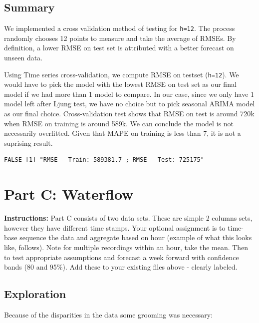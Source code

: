 \documentclass[openany]{book}
\renewenvironment{quote}{\begin{myquote}}{\end{myquote}}
\begin{document}
\hypertarget{summary-1}{%
\section{Summary}\label{summary-1}}

We implemented a cross validation method of testing for \texttt{h=12}.
The process randomly chooses 12 points to measure and take the average
of RMSEs. By definition, a lower RMSE on test set is attributed with a
better forecast on unseen data.

Using Time series cross-validation, we compute RMSE on testset
(\texttt{h=12}). We would have to pick the model with the lowest RMSE on
test set as our final model if we had more than 1 model to compare. In
our case, since we only have 1 model left after Ljung test, we have no
choice but to pick seasonal ARIMA model as our final choice.
Cross-validation test shows that RMSE on test is around 720k when RMSE
on training is around 589k. We can conclude the model is not necessarily
overfitted. Given that MAPE on training is less than 7, it is not a
suprising result.

\begin{verbatim}
FALSE [1] "RMSE - Train: 589381.7 ; RMSE - Test: 725175"
\end{verbatim}

\hypertarget{part-c-waterflow}{%
\chapter{Part C: Waterflow}\label{part-c-waterflow}}

\begin{quote}
\textbf{Instructions:} Part C consists of two data sets. These are
simple 2 columns sets, however they have different time stamps. Your
optional assignment is to time-base sequence the data and aggregate
based on hour (example of what this looks like, follows). Note for
multiple recordings within an hour, take the mean. Then to test
appropriate assumptions and forecast a week forward with confidence
bands (80 and 95\%). Add these to your existing files above - clearly
labeled.
\end{quote}

\hypertarget{exploration-2}{%
\section{Exploration}\label{exploration-2}}

Because of the disparities in the data some grooming was necessary:
\end{document}
